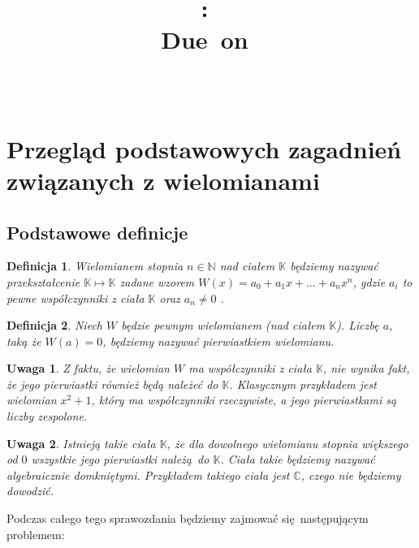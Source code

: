 \documentclass{article}
\title{
\vspace{2in}
\textmd{\textbf{\hmwkClass:\ \hmwkTitle}}\\
\normalsize\vspace{0.1in}\small{Due\ on\ \hmwkDueDate}\\
\vspace{0.1in}\large{\textit{\hmwkClassInstructor\ \hmwkClassTime}}
\vspace{3in}
}
\author{\textbf{\hmwkAuthorName}}
\date{} %
\newtheorem{remark}{Uwaga}
\newtheorem{definicja}{Definicja}
\begin{document}
\tableofcontents

\section{Przegląd podstawowych zagadnień związanych z wielomianami}

\subsection{Podstawowe definicje}

\begin{definicja}
Wielomianem stopnia $n \in \mathbb{N}$ nad ciałem $\mathbb{K}$ będziemy nazywać przekształcenie $\mathbb{K} \mapsto \mathbb{K}$ zadane wzorem $W(x) = a_0 + a_1x + \ldots + a_n x^n$, gdzie $a_i$ to pewne  współczynniki z ciała $\mathbb{K}$ oraz $a_n \neq 0$ .
\end{definicja}

\begin{definicja}
Niech $W$ będzie pewnym wielomianem (nad ciałem $\mathbb{K}$). Liczbę $a$, taką że $W(a) = 0$, będziemy nazywać pierwiastkiem wielomianu.
\end{definicja}

\begin{remark}
Z faktu, że wielomian $W$ ma współczynniki z ciała $\mathbb{K}$, nie wynika fakt, że jego pierwiastki również będą należeć do $\mathbb{K}$. Klasycznym przykładem jest wielomian $x^2 + 1$, który ma współczynniki rzeczywiste, a jego pierwiastkami są liczby zespolone.
\end{remark}

\begin{remark}
Istnieją takie ciała $\mathbb{K}$, że dla dowolnego wielomianu stopnia większego od $0$ wszystkie jego pierwiastki należą do $\mathbb{K}$. Ciała takie będziemy nazywać algebraicznie domkniętymi. Przykładem takiego ciała jest $\mathbb{C}$, czego nie będziemy dowodzić. 
\end{remark}

Podczas całego tego sprawozdania będziemy zajmować się następującym problemem:

\begin{center}
\end{center}
\end{document}
